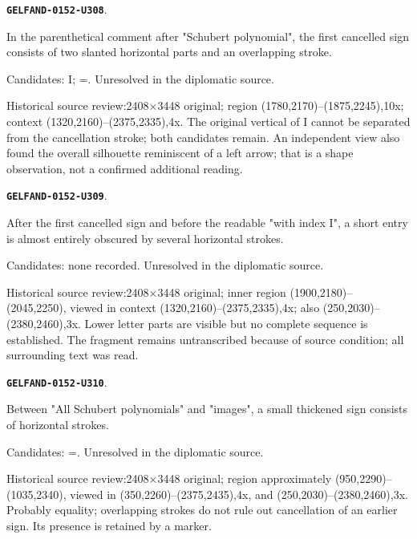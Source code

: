 \documentclass[11pt]{article}
\theoremstyle{definition}
\theoremstyle{remark}
\begin{document}
\par\noindent\leavevmode{}\label{GELFAND-0152-U308}\label{GELFAND-P001402:note-20-first-sign:note}\textbf{\texttt{GELFAND-0152-U308}}.\nopagebreak[4]\par
In the parenthetical comment after "Schubert polynomial", the first cancelled sign consists of two slanted horizontal parts and an overlapping stroke.\par
Candidates: I; =. Unresolved in the diplomatic source.\par
Historical source review:2408×3448 original; region (1780,2170)–(1875,2245),10x; context (1320,2160)–(2375,2335),4x. The original vertical of I cannot be separated from the cancellation stroke; both candidates remain. An independent view also found the overall silhouette reminiscent of a left arrow; that is a shape observation, not a confirmed additional reading.\par\medskip
\par\noindent\leavevmode{}\label{GELFAND-0152-U309}\label{GELFAND-P001402:note-20-cancelled-word:note}\textbf{\texttt{GELFAND-0152-U309}}.\nopagebreak[4]\par
After the first cancelled sign and before the readable "with index I", a short entry is almost entirely obscured by several horizontal strokes.\par
Candidates: none recorded. Unresolved in the diplomatic source.\par
Historical source review:2408×3448 original; inner region (1900,2180)–(2045,2250), viewed in context (1320,2160)–(2375,2335),4x; also (250,2030)–(2380,2460),3x. Lower letter parts are visible but no complete sequence is established. The fragment remains untranscribed because of source condition; all surrounding text was read.\par\medskip
\par\noindent\leavevmode{}\label{GELFAND-0152-U310}\label{GELFAND-P001402:all-schubert-sign:note}\textbf{\texttt{GELFAND-0152-U310}}.\nopagebreak[4]\par
Between "All Schubert polynomials" and "images", a small thickened sign consists of horizontal strokes.\par
Candidates: =. Unresolved in the diplomatic source.\par
Historical source review:2408×3448 original; region approximately (950,2290)–(1035,2340), viewed in (350,2260)–(2375,2435),4x, and (250,2030)–(2380,2460),3x. Probably equality; overlapping strokes do not rule out cancellation of an earlier sign. Its presence is retained by a marker.\par\medskip
\end{document}

